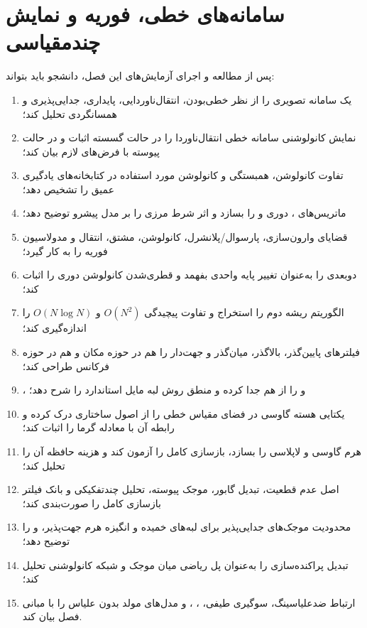 \documentclass[12pt,openany,oneside]{book}
\begin{document}
\tableofcontents

\mainmatter
\setcounter{chapter}{2}
\chapter{سامانه‌های خطی، فوریه و نمایش چندمقیاسی}
\label{chap:lti-fourier-multiscale}

\begin{learningbox}
پس از مطالعه و اجرای آزمایش‌های این فصل، دانشجو باید بتواند:
\begin{enumerate}
\item یک سامانه تصویری را از نظر خطی‌بودن، انتقال‌ناوردایی، پایداری، جدایی‌پذیری و همسانگردی تحلیل کند؛
\item نمایش کانولوشنی سامانه خطی انتقال‌ناوردا را در حالت گسسته اثبات و در حالت پیوسته با فرض‌های لازم بیان کند؛
\item تفاوت کانولوشن، همبستگی و کانولوشن مورد استفاده در کتابخانه‌های یادگیری عمیق را تشخیص دهد؛
\item ماتریس‌های ، دوری و  را بسازد و اثر شرط مرزی را بر مدل پیشرو توضیح دهد؛
\item قضایای وارون‌سازی، پارسوال/پلانشرل، کانولوشن، مشتق، انتقال و مدولاسیون فوریه را به کار گیرد؛
\item {} دوبعدی را به‌عنوان تغییر پایه واحدی بفهمد و قطری‌شدن کانولوشن دوری را اثبات کند؛
\item الگوریتم  ریشه دوم را استخراج و تفاوت پیچیدگی \(O(N^2)\) و \(O(N\log N)\) را اندازه‌گیری کند؛
\item فیلترهای پایین‌گذر، بالاگذر، میان‌گذر و جهت‌دار را هم در حوزه مکان و هم در حوزه فرکانس طراحی کند؛
\item {}،  و  را از هم جدا کرده و منطق روش لبه مایل استاندارد  را شرح دهد؛
\item یکتایی هسته گاوسی در فضای مقیاس خطی را از اصول ساختاری درک کرده و رابطه آن با معادله گرما را اثبات کند؛
\item هرم گاوسی و لاپلاسی را بسازد، بازسازی کامل را آزمون کند و هزینه حافظه آن را تحلیل کند؛
\item اصل عدم قطعیت، تبدیل گابور، موجک پیوسته، تحلیل چندتفکیکی و بانک فیلتر بازسازی کامل را صورت‌بندی کند؛
\item محدودیت موجک‌های جدایی‌پذیر برای لبه‌های خمیده و انگیزه هرم جهت‌پذیر،  و  را توضیح دهد؛
\item تبدیل پراکنده‌سازی را به‌عنوان پل ریاضی میان موجک و شبکه کانولوشنی تحلیل کند؛
\item ارتباط ضدعلیاسینگ، سوگیری طیفی، ، ،  و مدل‌های مولد بدون علیاس را با مبانی فصل بیان کند.
\end{enumerate}
\end{learningbox}
\end{document}
